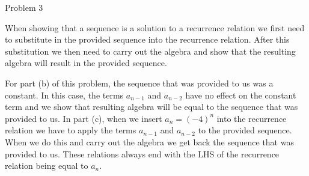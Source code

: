 \begin{problem}{Problem 3}
\begin{highlight}[Solution - \#12]
        When showing that a sequence is a solution to a recurrence relation we first need to substitute in the provided sequence into the recurrence relation. After this substitution we then need to
        carry out the algebra and show that the resulting algebra will result in the provided sequence.

        For part (b) of this problem, the sequence that was provided to us was a constant. In this case, the terms $a_{n-1}$ and $a_{n-2}$ have no effect on the constant term and we show that resulting
        algebra will be equal to the sequence that was provided to us. In part (c), when we insert $a_{n} = (-4)^{n}$ into the recurrence relation we have to apply the terms $a_{n-1}$ and $a_{n-2}$ to 
        the provided sequence. When we do this and carry out the algebra we get back the sequence that was provided to us. These relations always end with the LHS of the recurrence relation being equal
        to $a_{n}$.
    \end{highlight}
\end{problem}

